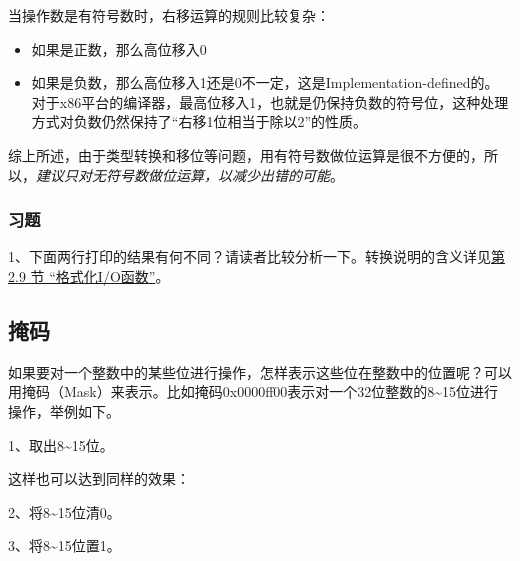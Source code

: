 当操作数是有符号数时，右移运算的规则比较复杂：


\begin{itemize}

\item 如果是正数，那么高位移入0

\item 如果是负数，那么高位移入1还是0不一定，这是Implementation-defined的。对于x86平台的编译器，最高位移入1，也就是仍保持负数的符号位，这种处理方式对负数仍然保持了“右移1位相当于除以2”的性质。
\end{itemize}


综上所述，由于类型转换和移位等问题，用有符号数做位运算是很不方便的，所以，\emph{建议只对无符号数做位运算，以减少出错的可能}。


\subsubsection*{习题}
%


1、下面两行打印的结果有何不同？请读者比较分析一下。转换说明的含义详见\hyperlink{db.ch25s02.id2832755}{第 2.\BookSplit{}9 节 “格式化I/\BookSplit{}O函数”}。



\subsection{掩码}
%


如果要对一个整数中的某些位进行操作，怎样表示这些位在整数中的位置呢？可以用掩码（Mask）来表示。比如掩码0x0000ff00表示对一个32位整数的8\textasciitilde{}\BookSplit{}15位进行操作，举例如下。



1、取出8\textasciitilde{}\BookSplit{}15位。




这样也可以达到同样的效果：




2、将8\textasciitilde{}\BookSplit{}15位清0。




3、将8\textasciitilde{}\BookSplit{}15位置1。



